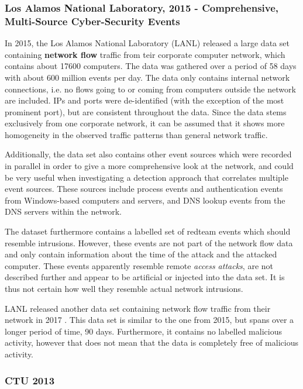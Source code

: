\documentclass[a4paper,12pt,twoside]{report}
\begin{document}
\subsubsection*{Los Alamos National Laboratory, 2015 - Comprehensive, Multi-Source Cyber-Security Events \cite{akent-2015-enterprise-data}\cite{kent-2015-cyberdata1}}

In 2015, the Los Alamos National Laboratory (LANL) released a large data set containing \textbf{network flow} traffic from teir corporate computer network, which contains about 17600 computers. The data was gathered over a period of 58 days with about 600 million events per day. The data only contains internal network connections, i.e. no flows going to or coming from computers outside the network are included. IPs and ports were de-identified (with the exception of the most prominent port), but are consistent throughout the data. Since the data stems exclusively from one corporate network, it can be assumed that it shows more homogeneity in the observed traffic patterns than  general network traffic.

Additionally, the data set also contains other event sources which were recorded in parallel in order to give a more comprehensive look at the network, and could be very useful when investigating a detection approach that correlates multiple event sources. These sources include process events and authentication events from Windows-based computers and servers, and DNS lookup events from the DNS servers within the network. 

The dataset furthermore contains a labelled set of redteam events which should resemble intrusions. However, these events are not part of the network flow data and only contain information about the time of the attack and the attacked computer. These events apparently resemble remote \textit{access attacks}, are not described further and appear to be artificial or injected into the data set. It is thus not certain how well they resemble actual network intrusions.


LANL released another data set containing network flow traffic from their network in 2017 \cite{turcotte17}. This data set is similar to the one from 2015, but spans over a longer period of time, 90 days. Furthermore, it contains no labelled malicious activity,  however that does not mean that the data is completely free of malicious activity.

\subsubsection*{CTU 2013 \cite{noauthor_ctu-13_nodate, garcia2014empirical}}
\end{document}
